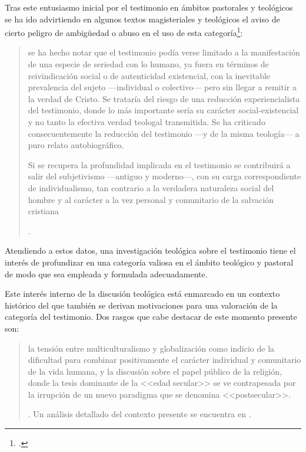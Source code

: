 Tras este entusiasmo inicial por el testimonio en ámbitos pastorales y teológicos se ha ido advirtiendo en algunos textos magisteriales y teológicos el aviso de cierto peligro de ambigüedad o abuso en el uso de esta categoría\footcite[Cf.][83]{prades2015testimonio}: \blockquote[{\Cite[84]{prades2015testimonio}}.]{se ha hecho notar que el testimonio podía verse limitado a la manifestación de una especie de seriedad con lo humano, ya fuera en términos de reivindicación social o de autenticidad existencial, con la inevitable prevalencia del sujeto ---individual o colectivo--- pero sin llegar a remitir a la verdad de Cristo. \textelp{
}
Se trataría del riesgo de una reducción experiencialista del testimonio, donde lo más importante sería su carácter social-existencial y no tanto la efectiva verdad teologal transmitida. Se ha criticado consecuentemente la reducción del testimonio ---y de la misma teología--- a puro relato autobiográfico.

Si se recupera la profundidad implicada en el testimonio se contribuirá a salir del subjetivismo ---antiguo y moderno---, con su carga correspondiente de individualismo, tan contrario a la verdadera naturaleza social del hombre y al carácter a la vez personal y comunitario de la salvación cristiana}. Atendiendo a estos datos, una investigación teológica sobre el testimonio tiene el interés de profundizar en una categoría valiosa en el ámbito teológico y pastoral de modo que sea empleada y formulada adecuadamente.

Este interés interno de la discusión teológica está enmarcado en un contexto histórico del que también se derivan motivaciones para una valoración de la categoría del testimonio. Dos rasgos que cabe destacar de este momento presente son: \blockquote[{\Cite[75]{prades2015testimonio}}. Un análisis detallado del contexto presente se encuentra en {\cite[3-77]{prades2015testimonio}}.]{la tensión entre multiculturalismo y globalización como indicio de la dificultad para combinar positivamente el carácter individual y comunitario de la vida humana, y la discusión sobre el papel público de la religión, donde la tesis dominante de la <<edad secular>> se ve contrapesada por la irrupción de un nuevo paradigma que se denomina <<postsecular>>.}

